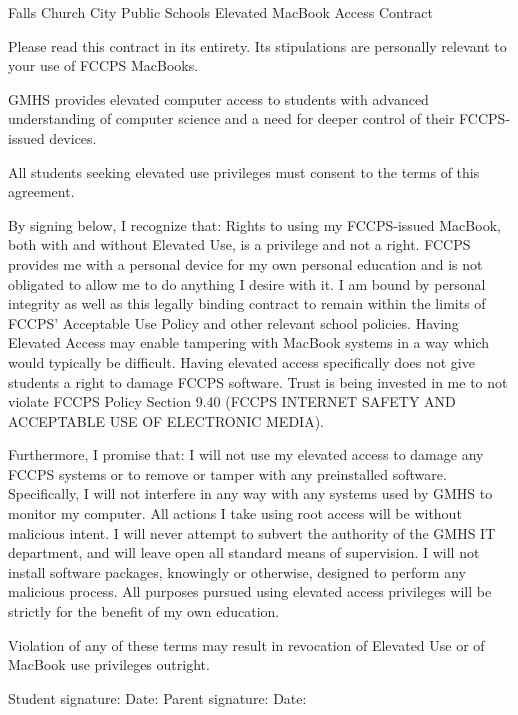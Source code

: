 \documentclass{article}
\begin{document}
Falls Church City Public Schools
Elevated MacBook Access Contract

Please read this contract in its entirety. Its stipulations are personally relevant to your use of FCCPS MacBooks.

GMHS provides elevated computer access to students with advanced understanding of computer science and a need for deeper control of their FCCPS-issued devices.

All students seeking elevated use privileges must consent to the terms of this agreement.

By signing below, I recognize that:
Rights to using my FCCPS-issued MacBook, both with and without Elevated Use, is a privilege and not a right. FCCPS provides me with a personal device for my own personal education and is not obligated to allow me to do anything I desire with it.
I am bound by personal integrity as well as this legally binding contract to remain within the limits of FCCPS’ Acceptable Use Policy and other relevant school policies.
Having Elevated Access may enable tampering with MacBook systems in a way which would typically be difficult. Having elevated access specifically does not give students a right to damage FCCPS software.
Trust is being invested in me to not violate FCCPS Policy Section 9.40 (FCCPS INTERNET SAFETY AND ACCEPTABLE USE OF ELECTRONIC MEDIA).

Furthermore, I promise that:
I will not use my elevated access to damage any FCCPS systems or to remove or tamper with any preinstalled software. Specifically, I will not interfere in any way with any systems used by GMHS to monitor my computer.
All actions I take using root access will be without malicious intent. I will never attempt to subvert the authority of the GMHS IT department, and will leave open all standard means of supervision.
I will not install software packages, knowingly or otherwise, designed to perform any malicious process.
All purposes pursued using elevated access privileges will be strictly for the benefit of my own education.

Violation of any of these terms may result in revocation of Elevated Use or of MacBook use privileges outright.

Student signature: \underline{\hspace{3cm}} Date: \underline{\hspace{2cm}}
Parent signature:  \underline{\hspace{3cm}} Date: \underline{\hspace{2cm}}
\end{document}
